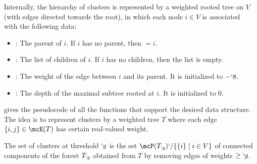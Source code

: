 Internally, the hierarchy of clusters is represented by a weighted rooted tree on $V$ (with edges
directed towards the root), in which each
node $i\in V$ is associated with the following data:
\begin{itemize}
	\item {}: The parent of $i$. If $i$ has no parent, then $=i$.
	\item {}: The list of children of $i$. If $i$ has no children, then the list is empty.
	\item {}: The weight of the edge between $i$ and its parent. It is initialized to $-`8$.
	\item {}: The depth of the maximal subtree rooted at $i$. It is initialized to $0$.
\end{itemize}
 gives the pseudocode of all the functions that support the desired data structure. The idea is to represent clusters by a weighted tree $T$ where each
edge $\Set {i,j}\in \mcE(T)$ has certain real-valued weight. %
\begin{lbox}
	The set of clusters at threshold $`g$ is the set $\mcP(T_{`g})`/\Set {\Set {i} \mid i\in V}$ of
	connected components of the forest $T_{`g}$ obtained from $T$ by removing edges of weights $\geq
	`g$.
\end{lbox}

